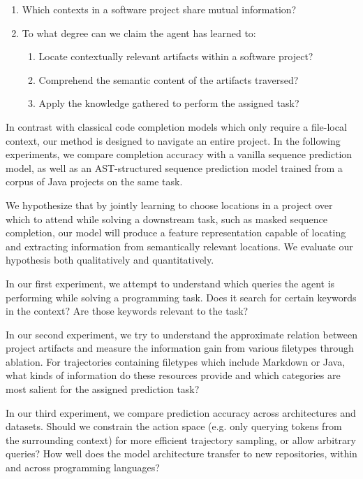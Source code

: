\documentclass[11pt]{article}
\begin{document}
\begin{enumerate}
  \item Which contexts in a software project share mutual information?
  \item To what degree can we claim the agent has learned to:\begin{enumerate}
  \item Locate contextually relevant artifacts within a software project?
  \item Comprehend the semantic content of the artifacts traversed?
  \item Apply the knowledge gathered to perform the assigned task?
  \end{enumerate}
\end{enumerate}

In contrast with classical code completion models which only require a file-local context, our method is designed to navigate an entire project. In the following experiments, we compare completion accuracy with a vanilla sequence prediction model, as well as an AST-structured sequence prediction model trained from a corpus of Java projects on the same task.

We hypothesize that by jointly learning to choose locations in a project over which to attend while solving a downstream task, such as masked sequence completion, our model will produce a feature representation capable of locating and extracting information from semantically relevant locations. We evaluate our hypothesis both qualitatively and quantitatively.

In our first experiment, we attempt to understand which queries the agent is performing while solving a programming task. Does it search for certain keywords in the context? Are those keywords relevant to the task?

In our second experiment, we try to understand the approximate relation between project artifacts and measure the information gain from various filetypes through ablation. For trajectories containing filetypes which include Markdown or Java, what kinds of information do these resources provide and which categories are most salient for the assigned prediction task?

In our third experiment, we compare prediction accuracy across architectures and datasets. Should we constrain the action space (e.g. only querying tokens from the surrounding context) for more efficient trajectory sampling, or allow arbitrary queries? How well does the model architecture transfer to new repositories, within and across programming languages?
\end{document}
